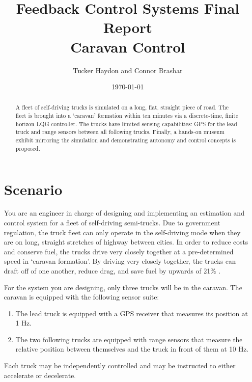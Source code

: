 \documentclass[12pt,onecolumn,reqno]{amsart}
\begin{document}
\title[]{Feedback Control Systems Final Report \\ Caravan Control}
\author[]{Tucker Haydon and Connor Brashar}
\address{The University of Texas at Austin}
\date{\today}
\begin{abstract}
  A fleet of self-driving trucks is simulated on a long, flat, straight piece of
  road. The fleet is brought into a `caravan' formation within ten minutes via a
  discrete-time, finite horizon LQG controller. The trucks have limited sensing
  capabilities: GPS for the lead truck and range sensors between all following
  trucks. Finally, a hands-on museum exhibit mirroring the simulation and
  demonstrating autonomy and control concepts is proposed.
\end{abstract}
\maketitle


\section{Scenario}
You are an engineer in charge of designing and implementing an estimation and
control system for a fleet of self-driving semi-trucks. Due to government
regulation, the truck fleet can only operate in the self-driving mode when they
are on long, straight stretches of highway between cities. In order to reduce
costs and conserve fuel, the trucks drive very closely together at a
pre-determined speed in `caravan formation'. By driving very closely together,
the trucks can draft off of one another, reduce drag, and save fuel by upwards
of 21\% \cite{bonnet2000fuel}.

For the system you are designing, only three trucks will be in the caravan. The
caravan is equipped with the following sensor suite: 
\begin{enumerate}
  \item The lead truck is equipped with a GPS receiver that measures its
    position at 1 Hz.
  \item The two following trucks are equipped with range sensors that measure
    the relative position between themselves and the truck in front of them at
    10 Hz.
\end{enumerate}

Each truck may be independently controlled and may be instructed to either
accelerate or decelerate.
\end{document}
